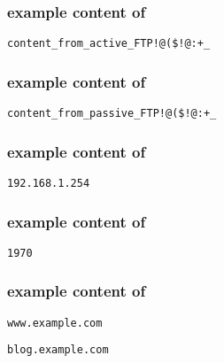 \hypertarget{activeformat}{}
\subsubsection*{example content of \texttt{\hyperlink{cp1ftp}{\fileactive}}}
\begin{mdframed}
\begin{Verbatim}
content_from_active_FTP!@($!@:+_
\end{Verbatim}
\end{mdframed}

\pagebreak

\hypertarget{passiveformat}{}
\subsubsection*{example content of \texttt{\hyperlink{cp1ftp}{\filepassive}}}
\begin{mdframed}
\begin{Verbatim}
content_from_passive_FTP!@($!@:+_
\end{Verbatim}
\end{mdframed}

\hypertarget{portscanformat}{}
\subsubsection*{example content of \texttt{\hyperlink{cp1portscan}{\fileportscan}}}
\begin{mdframed}
\begin{Verbatim}
192.168.1.254
\end{Verbatim}
\end{mdframed}

\hypertarget{yearformat}{}
\subsubsection*{example content of \texttt{\hyperlink{cp1year}{\fileyear}}}
\begin{mdframed}
\begin{Verbatim}
1970
\end{Verbatim}
\end{mdframed}

\hypertarget{domainformat}{}
\subsubsection*{example content of \texttt{\hyperlink{cp1domain}{\filedomain}}}
\begin{mdframed}
\begin{Verbatim}
www.example.com
\end{Verbatim}
\end{mdframed}
\vspace{-15pt}
\begin{mdframed}
\begin{Verbatim}
blog.example.com
\end{Verbatim}
\end{mdframed}

